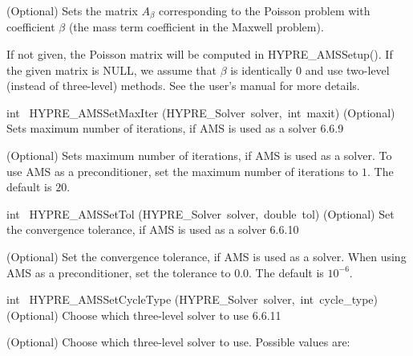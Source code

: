 \documentclass{article}
\begin{document}
\begin{cxxentry}
\begin{cxxentry}
\begin{cxxfunction}
\begin{cxxdoc}
(Optional) Sets the matrix $A_\beta$ corresponding to the Poisson
problem with coefficient $\beta$ (the mass term coefficient in the
Maxwell problem).

If not given, the Poisson matrix will be computed in HYPRE\_AMSSetup().
If the given matrix is NULL, we assume that $\beta$ is identically $0$
and use two-level (instead of three-level) methods. See the user's manual for more details.
\end{cxxdoc}
\end{cxxfunction}
\begin{cxxfunction}
{int\ }
        {HYPRE\_AMSSetMaxIter}
        {(HYPRE\_Solver\ solver,\ int\ maxit)}
        {
(Optional) Sets maximum number of iterations, if AMS is used
as a solver}
        {6.6.9}
\begin{cxxdoc}

(Optional) Sets maximum number of iterations, if AMS is used
as a solver. To use AMS as a preconditioner, set the maximum
number of iterations to $1$. The default is $20$.
\end{cxxdoc}
\end{cxxfunction}
\begin{cxxfunction}
{int\ }
        {HYPRE\_AMSSetTol}
        {(HYPRE\_Solver\ solver,\ double\ tol)}
        {
(Optional) Set the convergence tolerance, if AMS is used
as a solver}
        {6.6.10}
\begin{cxxdoc}

(Optional) Set the convergence tolerance, if AMS is used
as a solver. When using AMS as a preconditioner, set the tolerance
to $0.0$. The default is $10^{-6}$.
\end{cxxdoc}
\end{cxxfunction}
\begin{cxxfunction}
{int\ }
        {HYPRE\_AMSSetCycleType}
        {(HYPRE\_Solver\ solver,\ int\ cycle\_type)}
        {
(Optional) Choose which three-level solver to use}
        {6.6.11}
\begin{cxxdoc}

(Optional) Choose which three-level solver to use. Possible values are:


\end{cxxdoc}
\end{cxxfunction}
\end{cxxentry}
\end{cxxentry}
\end{document}
